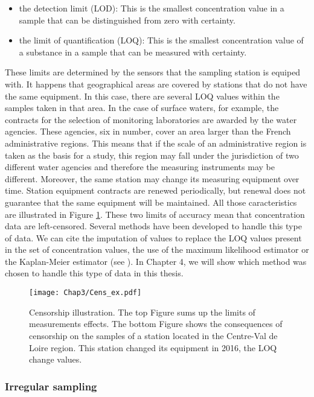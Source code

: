 \begin{itemize}
    \item the detection limit (LOD): This is the smallest concentration value in a sample that can be distinguished from zero with certainty.
    \item the limit of quantification (LOQ): This is the smallest concentration value of a substance in a sample that can be measured with certainty. 
\end{itemize}

These limits are determined by the sensors that the sampling station is equiped with. It happens that geographical areas are covered by stations that do not have the same equipment. In this case, there are several LOQ values within the samples taken in that area. In the case of surface waters, for example, the contracts for the selection of monitoring laboratories are awarded by the water agencies. These agencies, six in number, cover an area larger than the French administrative regions. This means that if the scale of an administrative region is taken as the basis for a study, this region may fall under the jurisdiction of two different water agencies and therefore the measuring instruments may be different. Moreover, the same station may change its measuring equipment over time. Station equipment contracts are renewed periodically, but renewal does not guarantee that the same equipment will be maintained. All those caracteristics are illustrated in Figure \ref{fig:cens_ex}. These two limits of accuracy mean that concentration data are left-censored. Several methods have been developed to handle this type of data. We can cite the imputation of values to replace the LOQ values present in the set of concentration values, the use of the maximum likelihood estimator or the Kaplan-Meier estimator (see \cite{Gillaizeau2020,Croghan2003MethodsOD}). In Chapter 4, we will show which method was chosen to handle this type of data in this thesis. 

\begin{figure}
    \centering
    \texttt{[image: Chap3/Cens\_ex.pdf]}
    \caption{Censorship illustration. The top Figure sums up the limits of measurements effects. The bottom Figure shows the consequences of censorship on the samples of a station located in the Centre-Val de Loire region. This station changed its equipment in 2016, the LOQ change values.}
    \label{fig:cens_ex}
\end{figure}

\subsubsection{Irregular sampling}

